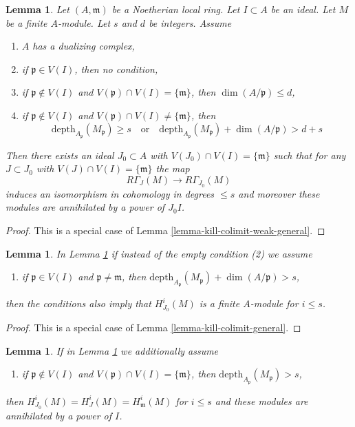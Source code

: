 \documentclass{stacks-project}
\theoremstyle{plain}
\newtheorem{lemma}[subsection]{Lemma}
\theoremstyle{definition}
\theoremstyle{remark}
\numberwithin{equation}{subsection}
\begin{document}
\begin{lemma}
\label{lemma-kill-colimit-weak}
Let $(A, \mathfrak m)$ be a Noetherian local ring.
Let $I \subset A$ be an ideal. Let $M$ be a finite $A$-module.
Let $s$ and $d$ be integers. Assume
\begin{enumerate}
\item $A$ has a dualizing complex,
\item if $\mathfrak p \in V(I)$, then no condition,
\item if $\mathfrak p \not \in V(I)$ and
$V(\mathfrak p) \cap V(I) = \{\mathfrak m\}$, then
$\dim(A/\mathfrak p) \leq d$,
\item if $\mathfrak p \not \in V(I)$ and
$V(\mathfrak p) \cap V(I) \not = \{\mathfrak m\}$, then
$$
\text{depth}_{A_\mathfrak p}(M_\mathfrak p) \geq s
\quad\text{or}\quad
\text{depth}_{A_\mathfrak p}(M_\mathfrak p) + \dim(A/\mathfrak p) > d + s
$$
\end{enumerate}
Then there exists an ideal $J_0 \subset A$ with
$V(J_0) \cap V(I) = \{\mathfrak m\}$ such that for any $J \subset J_0$ with
$V(J) \cap V(I) = \{\mathfrak m\}$ the map
$$
R\Gamma_J(M) \longrightarrow R\Gamma_{J_0}(M)
$$
induces an isomorphism in cohomology in degrees $\leq s$
and moreover these modules are annihilated by a power of $J_0I$.
\end{lemma}

\begin{proof}
This is a special case of Lemma \ref{lemma-kill-colimit-weak-general}.
\end{proof}

\begin{lemma}
\label{lemma-kill-colimit}
In Lemma \ref{lemma-kill-colimit-weak} if instead of the empty
condition (2) we assume
\begin{enumerate}
\item[(2')] if $\mathfrak p \in V(I)$ and $\mathfrak p \not = \mathfrak m$,
then $\text{depth}_{A_\mathfrak p}(M_\mathfrak p) + \dim(A/\mathfrak p) > s$,
\end{enumerate}
then the conditions also imply that $H^i_{J_0}(M)$ is a finite
$A$-module for $i \leq s$.
\end{lemma}

\begin{proof}
This is a special case of Lemma \ref{lemma-kill-colimit-general}.
\end{proof}

\begin{lemma}
\label{lemma-kill-colimit-support}
If in Lemma \ref{lemma-kill-colimit-weak} we additionally assume
\begin{enumerate}
\item[(6)] if $\mathfrak p \not \in V(I)$ and
$V(\mathfrak p) \cap V(I) = \{\mathfrak m\}$, then
$\text{depth}_{A_\mathfrak p}(M_\mathfrak p) > s$,
\end{enumerate}
then $H^i_{J_0}(M) = H^i_J(M) = H^i_\mathfrak m(M)$ for $i \leq s$
and these modules are annihilated by a power of $I$.
\end{lemma}
\end{document}
